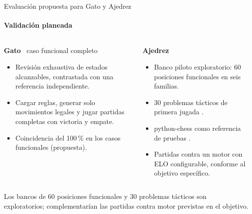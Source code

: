 \documentclass[aspectratio=169,10pt,t]{beamer}
\begin{document}
\begin{frame}{Evaluación propuesta para Gato y Ajedrez}
\framesubtitle{Validación planeada}
\renewcommand{\tarjetaalto}{4.4cm}
\begin{columns}[T]
\begin{tarjeta}[vino]
{\bfseries Gato}  \ {\scriptsize caso funcional completo}
\begin{itemize}\setlength\itemsep{1pt}\scriptsize
\item Revisión exhaustiva de estados alcanzables, contrastada con una referencia independiente.
\item Cargar reglas, generar solo movimientos legales y jugar partidas completas con victoria y empate.
\item Coincidencia del 100\,\% en los casos funcionales (propuesta).
\end{itemize}
\end{tarjeta}
\begin{tarjeta}[azulp]
{\bfseries Ajedrez}
\begin{itemize}\setlength\itemsep{1pt}\scriptsize
\item Banco piloto exploratorio: 60 posiciones funcionales en seis familias.
\item 30 problemas tácticos de primera jugada \cite{LichessPuzzles}.
\item python-chess como referencia de pruebas \cite{PythonChessCore}.
\item Partidas contra un motor con ELO configurable, conforme al objetivo específico.
\end{itemize}
\end{tarjeta}
\end{columns}
\vspace{2pt}
\begin{banda}[vinooscuro]
\scriptsize Los bancos de 60 posiciones funcionales y 30 problemas tácticos son exploratorios; complementarían las partidas contra motor previstas en el objetivo.
\end{banda}
\end{frame}
\end{document}
